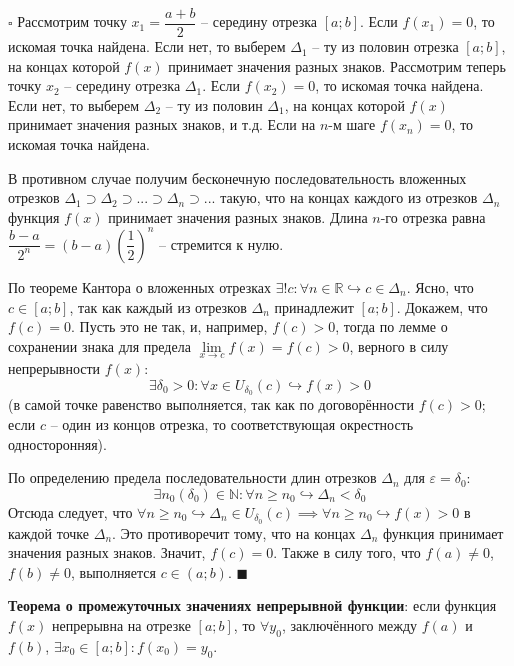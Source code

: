 \documentclass[12pt, a4paper, reqno]{article}
\begin{document}
    $\square$ Рассмотрим точку $x_1 = \dfrac{a+b}{2}$ -- середину отрезка $[a; b]$. Если $f(x_1) = 0$,
    то искомая точка найдена. Если нет, то выберем $\Delta_1$ -- ту из половин отрезка $[a; b]$, на
    концах которой $f(x)$ принимает значения разных знаков. Рассмотрим теперь точку $x_2$ -- середину
    отрезка $\Delta_1$. Если $f(x_2) = 0$, то искомая точка найдена. Если нет, то выберем $\Delta_2$
    -- ту из половин $\Delta_1$, на концах которой $f(x)$ принимает значения разных знаков, и т.д.
    Если на $n$-м шаге $f(x_n) = 0$, то искомая точка найдена.

    В противном случае получим бесконечную последовательность вложенных отрезков $\Delta_1 \supset
    \Delta_2 \supset ... \supset \Delta_n \supset ...$ такую, что на концах каждого из отрезков
    $\Delta_n$ функция $f(x)$ принимает значения разных знаков. Длина $n$-го отрезка равна
    $\dfrac{b - a}{2^n} = (b - a)\left(\dfrac{1}{2}\right)^n$ -- стремится к нулю.

    По теореме Кантора о вложенных отрезках $\exists!c: \forall n\in\mathbb{R}\hookrightarrow
    c\in\Delta_n$. Ясно, что $c\in[a; b]$, так как каждый из отрезков $\Delta_n$ принадлежит
    $[a; b]$. Докажем, что $f(c) = 0$. Пусть это не так, и, например, $f(c) > 0$, тогда по лемме о
    сохранении знака для предела $\lim\limits_{x\to c} f(x) = f(c) > 0$, верного в силу
    непрерывности $f(x)$:
    \begin{equation*}
        \exists\delta_0 > 0: \forall x\in U_{\delta_0}(c)\hookrightarrow f(x) > 0
    \end{equation*}
    (в самой точке равенство выполняется, так как по договорённости $f(c) > 0$; если $c$ -- один из
    концов отрезка, то соответствующая окрестность односторонняя).

    По определению предела последовательности длин отрезков $\Delta_n$ для $\varepsilon = \delta_0$:
    \begin{equation*}
        \exists n_0(\delta_0)\in\mathbb{N}: \forall n\geq n_0\hookrightarrow \Delta_n < \delta_0
    \end{equation*}
    Отсюда следует, что $\forall n \geq n_0\hookrightarrow \Delta_n\in U_{\delta_0}(c) \implies
    \forall n \geq n_0\hookrightarrow f(x) > 0$ в каждой точке $\Delta_n$. Это противоречит тому,
    что на концах $\Delta_n$ функция принимает значения разных знаков. Значит, $f(c) = 0$. Также в
    силу того, что $f(a) \neq 0$, $f(b) \neq 0$, выполняется $c\in(a; b)$. $\blacksquare$

    \textbf{Теорема о промежуточных значениях непрерывной функции}: если функция $f(x)$ непрерывна
    на отрезке $[a; b]$, то $\forall y_0$, заключённого между $f(a)$ и $f(b)$, $\exists x_0\in
    [a; b]: f(x_0) = y_0$.
\end{document}
